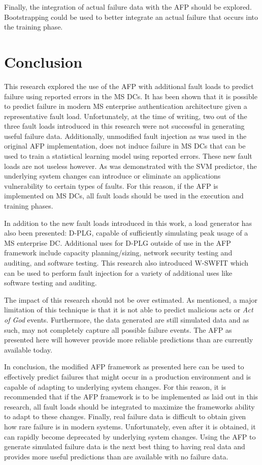 Finally, the integration of actual failure data with the \ac{AFP} should be
explored.  Bootstrapping could be used to better integrate an actual failure
that occurs into the training phase. 

\section{Conclusion}
This research explored the use of the \ac{AFP} with additional fault loads to
predict failure using reported errors in the \ac{MS} \ac{DC}s.  It has been
shown that it is possible to predict failure in modern \ac{MS} enterprise
authentication architecture given a representative fault load.  Unfortunately,
at the time of writing, two out of the three fault loads introduced in this
research were not successful in generating useful failure data.  Additionally,
unmodified fault injection as was used in the original \ac{AFP} implementation,
does not induce failure in \ac{MS} \ac{DC}s that can be used to train a
statistical learning model using reported errors.  These new fault loads are
not useless however.  As was demonstrated with the \ac{SVM} predictor, the
underlying system changes can introduce or eliminate an applications
vulnerability to certain types of faults.  For this reason, if the \ac{AFP} is
implemented on \ac{MS} \ac{DC}s, all fault loads should be used in the
execution and training phases.

In addition to the new fault loads introduced in this work, a load generator
has also been presented:  \ac{D-PLG}, capable of sufficiently simulating peak
usage of a \ac{MS} enterprise \ac{DC}.  Additional uses for \ac{D-PLG} outside
of use in the \ac{AFP} framework include capacity planning/sizing, network
security testing and auditing, and software testing.  This research also
introduced \ac{W-SWFIT} which can be used to perform fault injection for a
variety of additional uses like software testing and auditing.

The impact of this research should not be over estimated.  As mentioned, a
major limitation of this technique is that it is not able to predict malicious
acts or \emph{Act of God} events.  Furthermore, the data generated are still
simulated data and as such, may not completely capture all possible failure
events.  The \ac{AFP} as presented here will however provide more reliable
predictions than are currently available today.

In conclusion, the modified \ac{AFP} framework as presented here can be used to
effectively predict failures that might occur in a production environment and
is capable of adapting to underlying system changes.  For this reason, it is
recommended that if the \ac{AFP} framework is to be implemented as laid out in
this research, all fault loads should be integrated to maximize the frameworks
ability to adapt to these changes.  Finally, real failure data is difficult to
obtain given how rare failure is in modern systems.  Unfortunately, even after
it is obtained, it can rapidly become deprecated by underlying system changes.
Using the \ac{AFP} to generate simulated failure data is the next best thing to
having real data and provides more useful predictions than are available with
no failure data.

